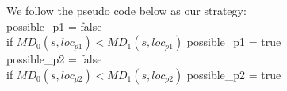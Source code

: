 \documentclass[12pt]{article}
\begin{document}
We follow the pseudo code below as our strategy:\\
possible\_p1 = false\\
if $MD_{0}(s,loc_{p1}) < MD_{1}(s,loc_{p1})$  possible\_p1 = true\\
possible\_p2 = false\\
if $MD_{0}(s,loc_{p2}) < MD_{1}(s,loc_{p2})$  possible\_p2 = true\\


\begin{comment}
$V_{maxp}(s,0) = \max(V_{p1}(s,0),V_{p2}(s,0))$\\
$V_{maxp}(s,1) = \max(V_{p1}(s,1),V_{p2}(s,1))$\\
If $V_{maxp}(s,0) > V_{p2}(s,0)$ and 
1. We can fulfill the drop with our gas and remaining turns - if the gas units we have is more than needed we pick 
If both passengers are closer to our agent than to the other taxi agent, we will select the most rewarding drop:\\

This is the cost of trip.\\
If we manage to get the passenger to its destination (we assume we take him
We calculate that for each passenger relative to each agent.\\
As a greedy agent, we go to the passenger that will give us the best value (closest and thus no
$MD(s,loc_{passenger})$gas wasting) w/o actually caring about the other agent actions (although we can consider his worst action, but it complicates the agent value estimation).\\
We need to take into consideration some constraints. otherwise, we go to the gas station:\\
1. The cash after the planned drop should be enough to go the closest gas station from the drop location. If not, we consider the other passenger.
2. We check the same constraint as before on the new passenger's drop location vs the closest gas station location. If not, we ..

If the other agent is closer, we will go on the second passenger.
As the distance is smaller, the value of the state is higher. So we inverse the distance to get a value function for our state by $\frac{1}{d}$
We may have negative 
 to first passenger and then to its destination and the same to the second passenger . We calculate the same for the other agent (to consider who will win).
2. 
\end{comment}
\end{document}

